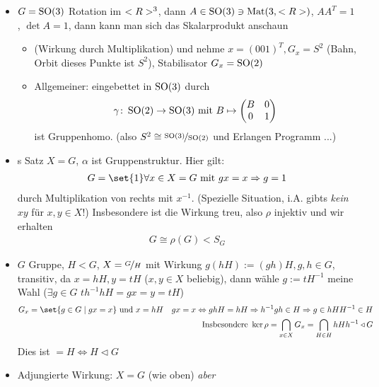 \begin{*example}
	\begin{itemize}
		\item $G = \operatorname{SO}(3)$ Rotation im $<R>^3$, dann $A \in \operatorname{SO}(3) \ni \operatorname{Mat}(3,<R>)$, $AA^T = 1$, $\det A = 1$, dann kann man sich das Skalarprodukt anschaun %
		\begin{itemize}
			\item (Wirkung durch Multiplikation) und nehme $x = (0 0 1)^T, G_x = S^2$ (Bahn, Orbit dieses Punkte ist $S^2$), Stabilisator $G_x = \operatorname{SO}(2)$
			\item Allgemeiner: eingebettet in $\operatorname{SO}(3)$ durch
			\begin{align*}
			\gamma\colon \operatorname{SO}(2) \to \operatorname{SO}(3) \text{ mit } B \mapsto \begin{pmatrix}
			B & 0\\
			0 & 1
			\end{pmatrix}			 
			\end{align*}
			ist Gruppenhomo. (also $S^2 \cong \lnkset{\SO(3)}{\SO(2)}$ und Erlangen Programm ...)
		\end{itemize}
		\item {}s Satz $X = G$, $\alpha$ ist Gruppenstruktur. Hier gilt:
		\begin{align*}
			G = \set{1}\forall x \in X = G \mit gx = x \implies g = 1
		\end{align*}
		durch Multiplikation von rechts mit $x^{-1}$. (Spezielle Situation, i.A. gibts \emph{kein} $xy$ für $x,y \in X$!) Insbesondere ist die Wirkung treu, also $\rho$ injektiv und wir erhalten
		\begin{align*}
			G \cong \rho(G) < S_G
		\end{align*}
		\item $G$ Gruppe, $H < G$, $X = \lnkset{G}{H}$ mit Wirkung $g(hH) := (gh)H, g,h \in G$, transitiv, da $x = hH, y= tH$ ($x,y \in X$ beliebig), dann wähle $g:= t H^{-1}$ meine Wahl ($\exists g \in G$ $t h^{-1}hH = gx = y = tH$)
		\begin{align*}
			G_x = \set{g \in G \mid gx = x} \und x = hH \quad gx = x \Leftrightarrow ghH = hH \implies h^{-1}gh \in H \implies g \in hHH^{-1} \in H\\
			\text{Insbesondere }\ker \rho = \bigcap_{x \in X} G_x = \bigcap_{H \in H} hHh^{-1} \lhd G 
		\end{align*}
		Dies ist $= H \Leftrightarrow H \lhd G$
		\item Adjungierte Wirkung: $X = G$ (wie oben) \emph{aber}
		\begin{align*}

\end{align*}
\end{itemize}
\end{*example}
